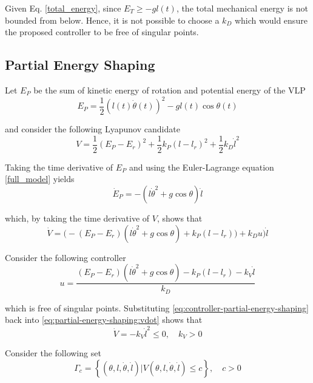 \documentclass[main.tex]{subfiles}
\begin{document}
Given Eq. \eqref{total_energy}, since $E_T \ge -gl(t)$,
the total mechanical energy is not bounded from below.
Hence, it is not possible to choose a $k_D$ which would
ensure the proposed controller to be free of singular
points.

\subsection{Partial  Energy Shaping}
Let $E_P$ be the sum of kinetic energy of rotation and potential
energy of the VLP
\begin{equation}
  \label{eq:partial-energy}
  E_P = \frac{1}{2}(l(t)\dot{\theta}(t))^2-gl(t)\cos\theta(t)
\end{equation}

\noindent and consider the following Lyapunov candidate
\begin{equation}
  \label{eq:lyapunov-function-partial-energy-shaping}
  V = \frac{1}{2}(E_P-E_r)^2+\frac{1}{2}k_P(l-l_r)^2+
      \frac{1}{2}k_D\dot{l}^2
\end{equation}

Taking the time derivative of $E_P$ and using the Euler-Lagrange
equation \eqref{full_model} yields
\begin{equation}
  \dot{E}_P = -(l\dot{\theta}^2+g\cos\theta)\dot{l}
\end{equation}

\noindent which, by taking the time derivative of $V$, shows that
\begin{equation}
  \label{eq:partial-energy-shaping:vdot}
  \dot{V} = \big(-(E_P-E_r)(l\dot{\theta}^2+g\cos\theta)+k_P(l-l_r)\big) + k_D u) \dot{l}
\end{equation}

Consider the following controller
\begin{equation}
  \label{eq:controller-partial-energy-shaping}
  u = \frac{(E_P-E_r)(l\dot{\theta}^2+g\cos\theta)-k_P(l-l_r)
      -k_V\dot{l}}{k_D}
\end{equation}

\noindent which is free of singular points. Substituting
\eqref{eq:controller-partial-energy-shaping} back into 
\eqref{eq:partial-energy-shaping:vdot} shows that
\begin{equation}
  \label{eq:partial-energy-shaping:v-nsd}
  \dot{V} = -k_V \dot{l}^2 \le 0, \quad k_V > 0
\end{equation}

Consider the following set
\begin{equation}
  \Gamma_c = \left\{(\theta,l,\dot{\theta},\dot{l})|
      V(\theta,l,\dot{\theta},\dot{l}) \le c\right\},
      \quad c > 0
\end{equation}
\end{document}

